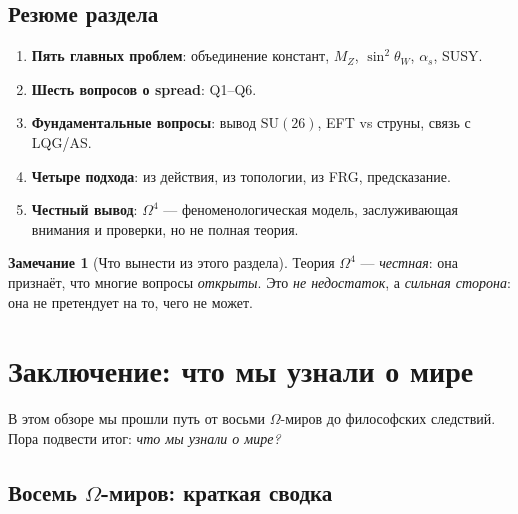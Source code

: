 \documentclass[11pt,a4paper]{article}
\newcommand{\SU}{\mathrm{SU}}
\newcommand{\Om}{\Omega^4}
\theoremstyle{definition}
\newtheorem{remark}[theorem]{Замечание}
\begin{document}
\subsection{Резюме раздела}
\label{subsec:open-summary}

\begin{enumerate}
    \item \textbf{Пять главных проблем}: объединение констант, 
          $M_Z$, $\sin^2\theta_W$, $\alpha_s$, SUSY.
    \item \textbf{Шесть вопросов о spread}: Q1--Q6.
    \item \textbf{Фундаментальные вопросы}: вывод $\SU(26)$, 
          EFT vs струны, связь с LQG/AS.
    \item \textbf{Четыре подхода}: из действия, из топологии, 
          из FRG, предсказание.
    \item \textbf{Честный вывод}: $\Om$ — феноменологическая 
          модель, заслуживающая внимания и проверки, но 
          не полная теория.
\end{enumerate}

\begin{remark}[Что вынести из этого раздела]
\label{rem:open-takeaway}
Теория $\Om$ — \emph{честная}: она признаёт, что многие 
вопросы \emph{открыты}. Это \emph{не недостаток}, а 
\emph{сильная сторона}: она не претендует на то, чего 
не может.
\end{remark}

\section{Заключение: что мы узнали о мире}
\label{sec:conclusions}

В этом обзоре мы прошли путь от восьми $\Omega$-миров 
до философских следствий. Пора подвести итог: \emph{что мы 
узнали о мире?}

\subsection{Восемь $\Omega$-миров: краткая сводка}
\label{subsec:conclusions-worlds}
\end{document}
